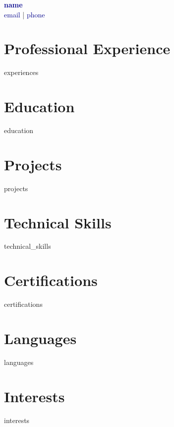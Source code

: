 \documentclass[11pt]{article}
\begin{document}
\begin{center}
    {\huge \textbf{\textcolor{darkblue}{{{ name }}}}} \\
    \vspace{5pt}
    \textcolor{darkblue}{{{ email }}} | \textcolor{darkblue}{{{ phone }}} \\
\end{center}

\vspace{10pt}

\section*{Professional Experience}
\begin{itemize}
{{ experiences }}
\end{itemize}

\section*{Education}
\begin{itemize}
{{ education }}
\end{itemize}

\section*{Projects}
\begin{itemize}
{{ projects }}
\end{itemize}

\section*{Technical Skills}
\begin{itemize}
{{ technical_skills }}
\end{itemize}

\section*{Certifications}
\begin{itemize}
{{ certifications }}
\end{itemize}

\section*{Languages}
\begin{itemize}
{{ languages }}
\end{itemize}

\section*{Interests}
\begin{itemize}
{{ interests }}
\end{itemize}
\end{document}
